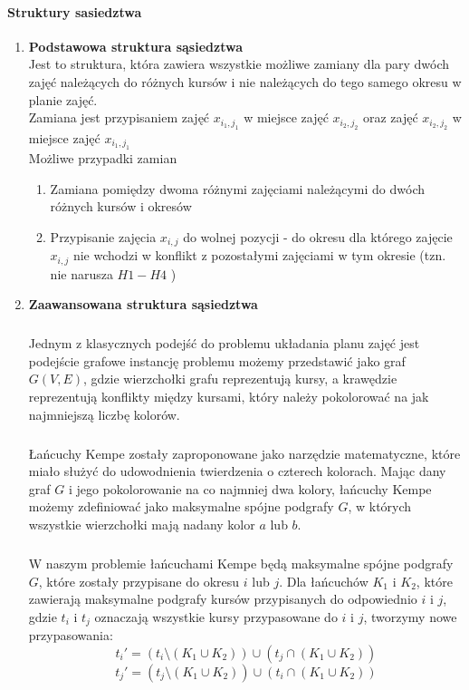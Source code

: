\paragraph{Struktury sasiedztwa}
\begin{enumerate}
\item \textbf{Podstawowa struktura sąsiedztwa} \\
Jest to struktura, która zawiera wszystkie możliwe zamiany dla pary dwóch zajęć należących do różnych kursów i nie należących do tego samego okresu w planie zajęć. \\
Zamiana jest przypisaniem zajęć $x_{i_{1},j_{1}}$ w miejsce zajęć ${x_{i_{2}, j_{2}}}$ oraz zajęć ${x_{i_{2}, j_{2}}}$ w miejsce zajęć $x_{i_{1},j_{1}}$ \\
Możliwe przypadki zamian
\begin{enumerate}
\item Zamiana pomiędzy dwoma różnymi zajęciami należącymi do dwóch różnych kursów i okresów
\item Przypisanie zajęcia ${x_{i,j}}$ do wolnej pozycji - do okresu dla którego zajęcie ${x_{i,j}}$ nie wchodzi w konflikt z pozostałymi zajęciami w tym okresie (tzn. nie narusza ${H1-H4}$ )
\end{enumerate}

\item \textbf{Zaawansowana struktura sąsiedztwa} 
\subparagraph{}
Jednym z klasycznych podejść do problemu układania planu zajęć jest podejście grafowe instancję problemu możemy przedstawić jako graf $G(V, E)$, gdzie wierzchołki grafu reprezentują kursy, a krawędzie reprezentują konflikty między kursami, który należy pokolorować na jak najmniejszą liczbę kolorów. 
\subparagraph{}Łańcuchy Kempe zostały zaproponowane jako narzędzie matematyczne, które miało służyć do udowodnienia twierdzenia o czterech kolorach. Mając dany graf $G$ i jego pokolorowanie na co najmniej dwa kolory, łańcuchy Kempe możemy zdefiniować jako maksymalne spójne podgrafy $G$, w których wszystkie wierzchołki mają nadany kolor $a$ lub $b$.
\subparagraph{}W naszym problemie łańcuchami Kempe będą maksymalne spójne podgrafy $G$, które zostały przypisane do okresu $i$ lub $j$. Dla łańcuchów $K_1$ i $K_2$, które zawierają maksymalne podgrafy kursów przypisanych do odpowiednio $i$ i $j$, gdzie $t_i$ i $t_j$ oznaczają wszystkie kursy przypasowane do $i$ i $j$, tworzymy nowe przypasowania:
\[ t_i' = (t_i \setminus  (K_1 \cup K_2)) \cup (t_j \cap (K_1 \cup K_2)) \]
\[ t_j' = (t_j \setminus  (K_1 \cup K_2)) \cup (t_i \cap (K_1 \cup K_2)) \]


\end{enumerate}

